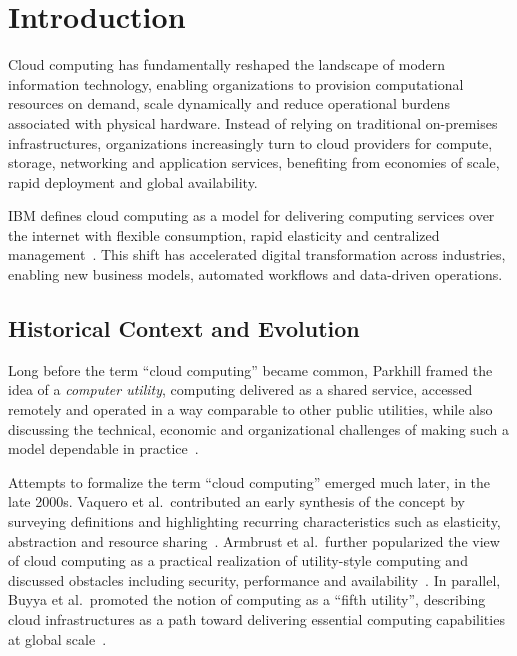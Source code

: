 \chapter{Introduction}
\label{cha:introduction}


Cloud computing has fundamentally reshaped the landscape of modern information technology, enabling organizations to provision computational resources on demand, scale dynamically and reduce operational burdens associated with physical hardware. Instead of relying on traditional on-premises infrastructures, organizations increasingly turn to cloud providers for compute, storage, networking and application services, benefiting from economies of scale, rapid deployment and global availability.

IBM defines cloud computing as a model for delivering computing services over the internet with flexible consumption, rapid elasticity and centralized management~\cite{ibmCloudComputing}. This shift has accelerated digital transformation across industries, enabling new business models, automated workflows and data-driven operations.

\section{Historical Context and Evolution}
\label{sec:int_his_con_evo}

Long before the term ``cloud computing'' became common, Parkhill framed the idea of a \emph{computer utility}, computing delivered as a shared service, accessed remotely and operated in a way comparable to other public utilities, while also discussing the technical, economic and organizational challenges of making such a model dependable in practice~\cite{parkhill1966challenge}. 

Attempts to formalize the term ``cloud computing'' emerged much later, in the late 2000s. Vaquero et al.\ contributed an early synthesis of the concept by surveying definitions and highlighting recurring characteristics such as elasticity, abstraction and resource sharing~\cite{vaquero2008breaks}. Armbrust et al.\ further popularized the view of cloud computing as a practical realization of utility-style computing and discussed obstacles including security, performance and availability~\cite{armbrust2010view}. In parallel, Buyya et al.\ promoted the notion of computing as a ``fifth utility'', describing cloud infrastructures as a path toward delivering essential computing capabilities at global scale~\cite{buyya2009cloud}.

